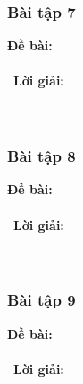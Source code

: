 \documentclass[a4paper]{article}
\begin{document}
\subsubsection{Bài tập 7}
\textbf{Đề bài:} 
\\\ \\\
\textbf{Lời giải:} \\\ \\\
\clearpage
\subsubsection{Bài tập 8}
\textbf{Đề bài:} 
\\\ \\\
\textbf{Lời giải:} \\\ \\\
\clearpage
\subsubsection{Bài tập 9}
\textbf{Đề bài:} 
\\\ \\\
\textbf{Lời giải:} \\\ \\\
\clearpage
\end{document}
